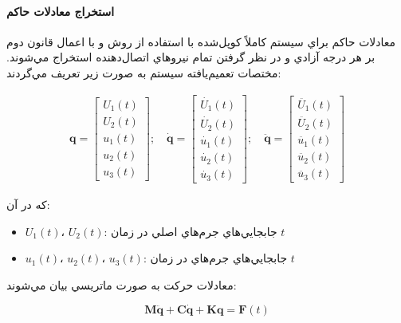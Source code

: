 \paragraph{استخراج معادلات حاكم}

معادلات حاكم براي سيستم كاملاً كوپل‌شده  با استفاده از روش  و با اعمال قانون دوم  بر هر درجه آزادي و در نظر گرفتن تمام نيروهاي اتصال‌دهنده استخراج مي‌شوند. مختصات تعميم‌يافته سيستم به صورت زير تعريف مي‌گردند:

\begin{align}\label{Eq.generalized.coordinate.2dof3dof}
    \mathbf{q} =
    \begin{bmatrix}
        U_1(t) \\
        U_2(t) \\
        u_1(t) \\
        u_2(t) \\
        u_3(t)
    \end{bmatrix}; \quad
    \dot{\mathbf{q}} =
    \begin{bmatrix}
        \dot{U_1}(t) \\
        \dot{U_2}(t) \\
        \dot{u_1}(t) \\
        \dot{u_2}(t) \\
        \dot{u_3}(t)
    \end{bmatrix}; \quad
    \ddot{\mathbf{q}} =
    \begin{bmatrix}
        \ddot{U_1}(t) \\
        \ddot{U_2}(t) \\
        \ddot{u_1}(t) \\
        \ddot{u_2}(t) \\
        \ddot{u_3}(t)
    \end{bmatrix}
\end{align}

كه در آن:
\begin{itemize}
    \item $U_1(t)$، $U_2(t)$: جابجايي‌هاي جرم‌هاي اصلي در زمان $t$
    \item $u_1(t)$، $u_2(t)$، $u_3(t)$: جابجايي‌هاي جرم‌هاي  در زمان $t$
\end{itemize}

معادلات حركت به صورت ماتريسي بيان مي‌شوند:

\begin{equation} \label{Eq.EOM_dimensional_combined}
    \mathbf{M} \ddot{\mathbf{q}} + \mathbf{C} \dot{\mathbf{q}} + \mathbf{K} \mathbf{q} = \mathbf{F}(t)
\end{equation}

